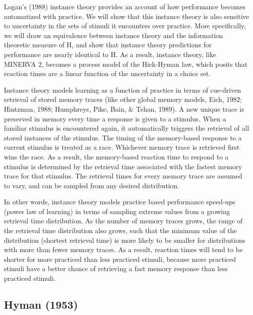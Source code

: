 \documentclass[,man,floatsintext]{apa6}
\begin{document}
Logan's (1988) instance theory provides an account of how performance becomes automatized with practice. We will show that this instance theory is also sensitive to uncertainty in the sets of stimuli it encounters over practice. More specifically, we will draw an equivalence between instance theory and the information theoretic measure of H, and show that instance theory predictions for performance are nearly identical to H. As a result, instance theory, like MINERVA 2, becomes a process model of the Hick-Hyman law, which posits that reaction times are a linear function of the uncertainty in a choice set.

Instance theory models learning as a function of practice in terms of cue-driven retrieval of stored memory traces (like other global memory models, Eich, 1982; Hintzman, 1988; Humphreys, Pike, Bain, \& Tehan, 1989). A new unique trace is preserved in memory every time a response is given to a stimulus. When a familiar stimulus is encountered again, it automatically triggers the retrieval of all stored instances of the stimulus. The timing of the memory-based response to a current stimulus is treated as a race. Whichever memory trace is retrieved first wins the race. As a result, the memory-based reaction time to respond to a stimulus is determined by the retrieval time associated with the fastest memory trace for that stimulus. The retrieval times for every memory trace are assumed to vary, and can be sampled from any desired distribution.

In other words, instance theory models practice based performance speed-ups (power law of learning) in terms of sampling extreme values from a growing retrieval time distribution. As the number of memory traces grows, the range of the retrieval time distribution also grows, such that the minimum value of the distribution (shortest retrieval time) is more likely to be smaller for distributions with more than fewer memory traces. As a result, reaction times will tend to be shorter for more practiced than less practiced stimuli, because more practiced stimuli have a better chance of retrieving a fast memory response than less practiced stimuli.

\hypertarget{hyman-1953}{%
\subsection{Hyman (1953)}\label{hyman-1953}}
\end{document}
